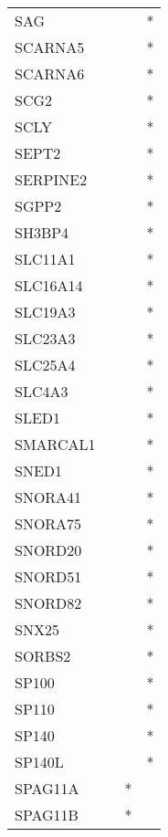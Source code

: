 \begin{longtable}{lccc}
SAG            &           &     &       * \\
SCARNA5        &           &     &       * \\
SCARNA6        &           &     &       * \\
SCG2           &           &     &       * \\
SCLY           &           &     &       * \\
SEPT2          &           &     &       * \\
SERPINE2       &           &     &       * \\
SGPP2          &           &     &       * \\
SH3BP4         &           &     &       * \\
SLC11A1        &           &     &       * \\
SLC16A14       &           &     &       * \\
SLC19A3        &           &     &       * \\
SLC23A3        &           &     &       * \\
SLC25A4        &           &     &       * \\
SLC4A3         &           &     &       * \\
SLED1          &           &     &       * \\
SMARCAL1       &           &     &       * \\
SNED1          &           &     &       * \\
SNORA41        &           &     &       * \\
SNORA75        &           &     &       * \\
SNORD20        &           &     &       * \\
SNORD51        &           &     &       * \\
SNORD82        &           &     &       * \\
SNX25          &           &     &       * \\
SORBS2         &           &     &       * \\
SP100          &           &     &       * \\
SP110          &           &     &       * \\
SP140          &           &     &       * \\
SP140L         &           &     &       * \\
SPAG11A        &           &   * &         \\
SPAG11B        &           &   * &         \\

\end{longtable}
